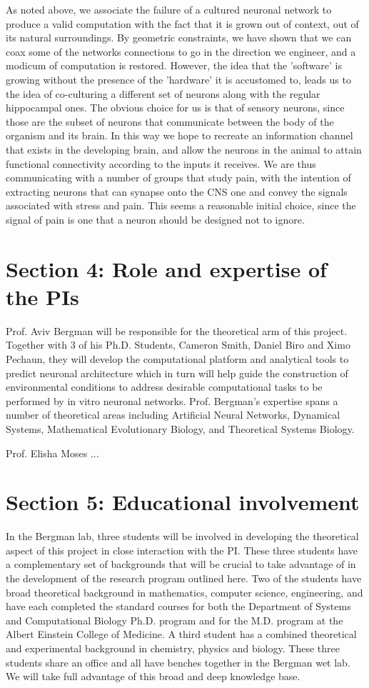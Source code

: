 As noted above, we associate the failure of a cultured neuronal network to produce a valid computation with the fact that it is grown out of context, out of its natural surroundings. By geometric constraints, we have shown that we can coax some of the networks connections to go in the direction we engineer, and a modicum of computation is restored. However, the idea that the 'software' is growing without the presence of the 'hardware' it is accustomed to, leads us to the idea of co-culturing a different set of neurons along with the regular hippocampal ones. The obvious choice for us is that of sensory neurons, since those are the subset of neurons that communicate between the body of the organism and its brain. In this way we hope to recreate an information channel that exists in the developing brain, and allow the neurons in the animal to attain functional connectivity according to the inputs it receives. 
We are thus communicating with a number of groups that study pain, with the intention of extracting neurons that can synapse onto the CNS one and convey the signals associated with stress and pain. This seems a reasonable initial choice, since the signal of pain is one that a neuron should be designed not to ignore.

\section{Section 4: Role and expertise of the PIs}

Prof. Aviv Bergman will be responsible for the theoretical arm of this project. Together with 3 of his Ph.D. Students, Cameron Smith, Daniel Biro and Ximo Pechaun, they will develop the computational platform and analytical tools to predict neuronal architecture which in turn will help guide the construction of environmental conditions to address desirable computational tasks to be performed by in vitro neuronal networks. Prof. Bergman's expertise spans a number of theoretical areas including Artificial Neural Networks, Dynamical Systems, Mathematical Evolutionary Biology, and Theoretical Systems Biology.

Prof. Elisha Moses ...

\section{Section 5: Educational involvement}
In the Bergman lab, three students will be involved in developing the theoretical aspect of this project in close interaction with the PI. These three students have a complementary set of backgrounds that will be crucial to take advantage of in the development of the research program outlined here. Two of the students have broad theoretical background in mathematics, computer science, engineering, and have each completed the standard courses for both the  Department of Systems and Computational Biology Ph.D. program and for the M.D. program at the Albert Einstein College of Medicine. A third student has a combined theoretical and experimental background in chemistry, physics and biology. These three students share an office and all have benches together in the Bergman wet lab. We will take full advantage of this broad and deep knowledge base.

